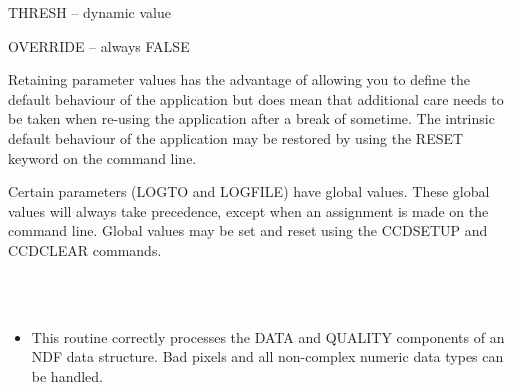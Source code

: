 \documentclass[twoside,11pt]{article}
\newcommand{\htmlref}[2]{#1}
\renewcommand{\_}{\texttt{\symbol{95}}}
\newcommand{\xroutine}[1]{\htmlref{{\sc #1}}{#1}}
\newcommand{\sstimplementationstatus}[1]{
   \item[{Implementation Status:}] \mbox{} \\[1.3ex] #1}
\newcommand{\sstitemlist}[1]{
  \mbox{} \\
  \vspace{-3.5ex}
  \begin{itemize}
     #1
  \end{itemize}
}
\newcommand{\sstitem}{\item}
\newcommand{\sstimplementationstatus}[1]{
      \item[Implementation Status:] #1
   }
\newcommand{\sstitemlist}[1]{
      \begin{itemize}
         #1
      \end{itemize}
      \\
   }
\newcommand{\sstitem}{\item}
\begin{document}
{{{         \sstitem
            THRESH   -- dynamic value
         \sstitem
            OVERRIDE -- always FALSE

      }
      Retaining parameter values has the advantage of allowing you to
      define the default behaviour of the application but does mean
      that additional care needs to be taken when re-using the
      application after a break of sometime. The intrinsic default
      behaviour of the application may be restored by using the RESET
      keyword on the command line.

      Certain parameters (LOGTO and LOGFILE) have global values. These
      global values will always take precedence, except when an
      assignment is made on the command line.  Global values may be set
      and reset using the \xroutine{CCDSETUP} and \xroutine{CCDCLEAR} commands.
   }
   \sstimplementationstatus{
      \sstitemlist{

         \sstitem
         This routine correctly processes the DATA and QUALITY components
           of an NDF data structure. Bad pixels and all non-complex numeric
           data types can be handled.
      }
   }
}
\end{document}

